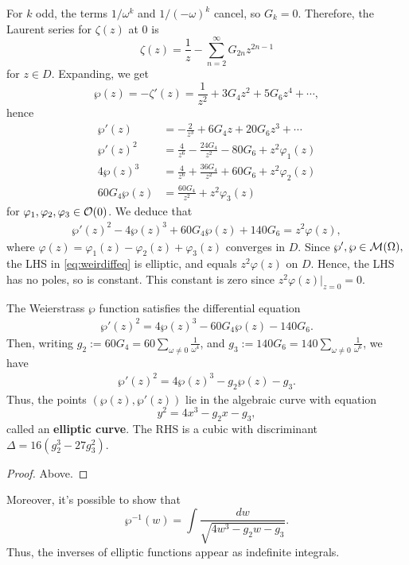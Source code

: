 \documentclass[11pt]{article}
\begin{document}
    For $k$ odd, the terms $1/\omega^k$ and $1/(-\omega)^k$ cancel, so $G_k=0$. Therefore, the Laurent series for $\zeta(z)$ at $0$ is
    $$\zeta(z) = \frac{1}{z}-\sum_{n=2}^\infty G_{2n}z^{2n-1}$$
    for $z \in D$. Expanding, we get
    $$\wp(z) = -\zeta'(z) = \frac{1}{z^2} + 3G_4z^2 + 5G_6z^4 + \cdots,$$
    hence
    \begin{align*}
        \wp'(z) &= -\frac{2}{z^3}+6G_4z + 20 G_6z^3 + \cdots 
        \\ \wp'(z)^2 &= \frac{4}{z^6}-\frac{24 G_4}{z^2}-80G_6 + z^2 \varphi_1(z)
        \\ 4\wp(z)^3 &= \frac{4}{z^6}+\frac{36 G_4}{z^2}+60G_6 + z^2 \varphi_2(z) \\ 60 G_4\wp(z) &= \frac{60G_4}{z^2} + z^2 \varphi_3(z)
    \end{align*}
    for $\varphi_1,\varphi_2,\varphi_3 \in \mathcal O(0)$. We deduce that
    \begin{align} \label{eq:weirdiffeq}
        \wp'(z)^2 - 4\wp(z)^3 + 60 G_4 \wp(z) + 140G_6 = z^2 \varphi(z),
    \end{align}
    where $\varphi(z) = \varphi_1(z) - \varphi_2(z) + \varphi_3(z)$ converges in $D$. Since $\wp',\wp \in \mathcal M (\Omega),$ the LHS in \eqref{eq:weirdiffeq} is elliptic, and equals $z^2 \varphi(z)$ on $D$. Hence, the LHS has no poles, so is constant. This constant is zero since $z^2 \varphi(z)|_{z=0}=0$.
    \begin{thm}
        The Weierstrass $\wp$ function satisfies the differential equation
        \begin{align*}
            \wp'(z)^2 = 4\wp(z)^3 -60G_4\wp(z) - 140G_6.
        \end{align*}
        Then, writing $g_2:=60G_4=60\sum_{\omega \neq 0}\frac{1}{\omega^4}$, and $g_3:= 140G_6=140\sum_{\omega \neq 0}\frac{1}{\omega^6}$, we have
        \begin{align*}
            \wp'(z)^2 = 4\wp(z)^3 - g_2\wp(z) - g_3.
        \end{align*}
        Thus, the points $(\wp(z),\wp'(z))$ lie in the algebraic curve with equation
        $$y^2 = 4x^3 - g_2x -g_3,$$
        called an \textbf{elliptic curve}. The RHS is a cubic with discriminant $\Delta = 16(g_2^3-27g_3^2)$.
    \end{thm}

\begin{proof}
    Above.
\end{proof}

Moreover, it's possible to show that
$$\wp^{-1}(w) = \int \frac{dw}{\sqrt{4w^3 - g_2w - g_3}}.$$
Thus, the inverses of elliptic functions appear as indefinite integrals.
\end{document}
